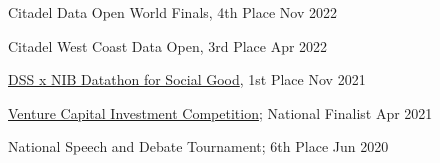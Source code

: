 Citadel Data Open World Finals, 4th Place \hfill Nov 2022\par
Citadel West Coast Data Open, 3rd Place \hfill Apr 2022\par
\href{https://www.facebook.com/events/933047190947185?}{DSS x NIB Datathon for Social Good}, 1st Place \hfill Nov 2021\par
\href{https://www.vcic.org/}{Venture Capital Investment Competition}; National Finalist \hfill Apr 2021\par
National Speech and Debate Tournament; 6th Place \hfill Jun 2020 \par